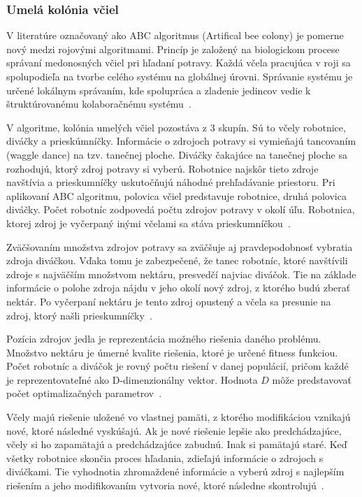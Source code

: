 \documentclass[a4paper,slovak,12pt,appendix]{article}
\begin{document}

\subsubsection{Umelá kolónia včiel}
V literatúre označovaný ako ABC algoritmus (Artifical bee colony) je pomerne
nový medzi rojovými algoritmami. Princíp je založený na biologickom procese
správaní medonosných včiel pri hľadaní potravy. Každá včela pracujúca
v roji sa spolupodieľa na tvorbe celého systému na globálnej úrovni. Správanie
systému je určené lokálnym správaním, kde spolupráca a zladenie jedincov vedie
k štruktúrovanému kolaboračnému systému~\cite{Chavan2015}.

V algoritme, kolónia umelých včiel pozostáva z 3 skupín. Sú to včely
robotnice, diváčky a prieskúmníčky. Informácie o zdrojoch potravy si vymieňajú
tancovaním (waggle dance) na tzv. tanečnej ploche. Diváčky čakajúce na tanečnej
ploche sa rozhodujú, ktorý zdroj potravy si vyberú. Robotnice najskôr tieto
zdroje navštívia a prieskumníčky uskutočňujú náhodné prehľadávanie priestoru.
Pri aplikovaní ABC algoritmu, polovica včiel
predstavuje robotnice, druhá polovica diváčky. Počet robotníc zodpovedá počtu
zdrojov potravy v okolí úľu. Robotnica, ktorej zdroj je vyčerpaný inými
včelami sa stáva prieskumníčkou~\cite{Karaboga2007}.

Zväčšovaním množstva zdrojov potravy sa zväčšuje aj pravdepodobnosť vybratia
zdroja diváčkou. Vďaka tomu je zabezpečené, že tanec robotníc, ktoré navštívili
zdroje s najväčším množstvom nektáru, presvedčí najviac diváčok. Tie
na základe informácie o polohe zdroja nájdu v jeho okolí nový zdroj, z ktorého
budú zberať nektár. Po vyčerpaní nektáru je tento zdroj opustený a včela sa
presunie na zdroj, ktorý našli prieskumníčky~\cite{Karaboga2007}.

Pozícia zdrojov jedla je reprezentácia možného riešenia daného problému.
Množstvo nektáru je úmerné kvalite riešenia, ktoré je určené fitness funkciou.
Počet robotníc a diváčok je rovný počtu riešení v danej populácií, pričom každé
je reprezentovateľné ako D-dimenzionálny vektor. Hodnota $D$ môže
predstavovať počet optimalizačných parametrov~\cite{Karaboga2007}.

Včely majú riešenie uložené vo vlastnej pamäti, z ktorého modifikáciou vznikajú
nové, ktoré následné vyskúšajú. Ak je nové riešenie lepšie ako predchádzajúce,
včely si ho zapamätajú a predchádzajúce zabudnú. Inak si pamätajú staré. Keď
všetky robotnice skončia proces hľadania, zdieľajú informácie o zdrojoch
s diváčkami. Tie vyhodnotia zhromaždené informácie a vyberú zdroj s najlepším
riešením a jeho modifikovaním vytvoria nové, ktoré následne
skontrolujú~\cite{Karaboga2007}.
\end{document}
